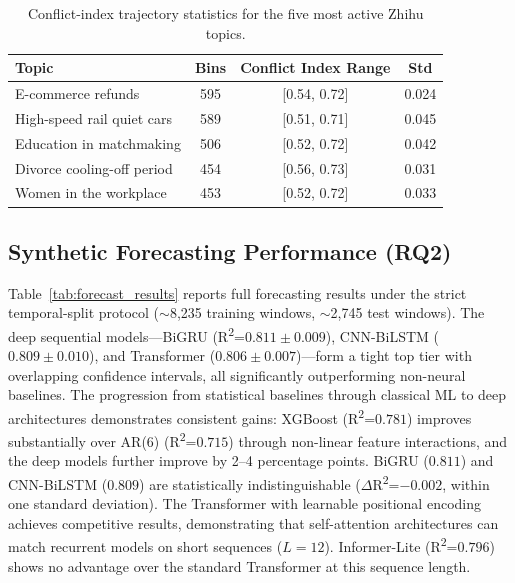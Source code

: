 \documentclass[11pt,a4paper]{article}
\begin{document}
\begin{table}[ht]
\centering
\caption{Conflict-index trajectory statistics for the five most active Zhihu topics.}
\label{tab:trajectory_stats}
\begin{tabular}{lccc}
\toprule
\textbf{Topic} & \textbf{Bins} & \textbf{Conflict Index Range} & \textbf{Std} \\
\midrule
E-commerce refunds & 595 & [0.54, 0.72] & 0.024 \\
High-speed rail quiet cars & 589 & [0.51, 0.71] & 0.045 \\
Education in matchmaking & 506 & [0.52, 0.72] & 0.042 \\
Divorce cooling-off period & 454 & [0.56, 0.73] & 0.031 \\
Women in the workplace & 453 & [0.52, 0.72] & 0.033 \\
\bottomrule
\end{tabular}
\end{table}

\subsection{Synthetic Forecasting Performance (RQ2)}

Table~\ref{tab:forecast_results} reports full forecasting results under the strict temporal-split protocol ($\sim$8,235 training windows, $\sim$2,745 test windows). The deep sequential models---BiGRU (R\textsuperscript{2}=$0.811\pm0.009$), CNN-BiLSTM ($0.809\pm0.010$), and Transformer ($0.806\pm0.007$)---form a tight top tier with overlapping confidence intervals, all significantly outperforming non-neural baselines. The progression from statistical baselines through classical ML to deep architectures demonstrates consistent gains: XGBoost (R\textsuperscript{2}=$0.781$) improves substantially over AR(6) (R\textsuperscript{2}=$0.715$) through non-linear feature interactions, and the deep models further improve by 2--4 percentage points. BiGRU ($0.811$) and CNN-BiLSTM ($0.809$) are statistically indistinguishable ($\Delta$R\textsuperscript{2}=$-0.002$, within one standard deviation). The Transformer with learnable positional encoding achieves competitive results, demonstrating that self-attention architectures can match recurrent models on short sequences ($L{=}12$). Informer-Lite (R\textsuperscript{2}=$0.796$) shows no advantage over the standard Transformer at this sequence length.
\end{document}
